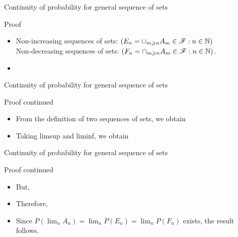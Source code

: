\documentclass[12pt,aspectratio=169]{beamer}
\begin{document}
\begin{frame}{Continuity of probability for general sequence of sets} 
    \begin{block}{Proof}
    \begin{itemize}
        \item <1-> Non-increasing sequences of sets: $(E_n = \cup_{m \geqslant n}A_m \in \mathscr{F}: n \in \mathbb{N})$ \\
        Non-decreasing sequences of sets: $(F_n = \cap_{m \geqslant n}A_m \in \mathscr{F}: n \in \mathbb{N})$. 
        \item <2->  
    \end{itemize}
    \end{block}
\end{frame}

\begin{frame}{Continuity of probability for general sequence of sets}
    \begin{block}{Proof continued}
    \begin{itemize}
        \item <1-> From the definition of two sequences of sets, we obtain 
        \item <2-> Taking limsup and liminf, we obtain 
    \end{itemize}
    \end{block}
\end{frame}

\begin{frame}{Continuity of probability for general sequence of sets}
    \begin{block}{Proof continued}
    \begin{itemize}
        \item <1-> But, 
        \item <2-> Therefore, 
        \item <3-> Since $P(\lim_n A_n) = \lim_nP(E_n) = \lim_{n}P(F_n)$ exists, the result follows.
    \end{itemize}
    \end{block}
\end{frame}
\end{document}
